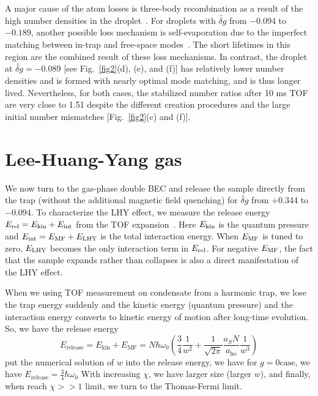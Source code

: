 A major cause of the atom losses is three-body recombination as a result of the high number densities in the droplet~\cite{cabrera2018quantum,semeghini2018self,DErrico2019}. For droplets with $\widetilde{\delta g}$ from $-0.094$ to $-0.189$, another possible loss mechanism is self-evaporation due to the imperfect matching between in-trap and free-space modes~\cite{Ferioli2020}. The short lifetimes in this region are the combined result of these loss mechanisms. In contrast, the droplet at $\widetilde{\delta g} = -0.089$ [see Fig.~\ref{fig2}(d), (e), and (f)] has relatively lower number densities and is formed with nearly optimal mode matching, and is thus longer lived. Nevertheless, for both cases, the stabilized number ratios after 10 ms TOF are very close to 1.51 despite the different creation procedures and the large initial number mismatches [Fig.~\ref{fig2}(c) and (f)].

\section{Lee-Huang-Yang gas}
\label{sec:LHY_gas}

We now turn to the gas-phase double BEC and release the sample directly from the trap (without the additional magnetic field quenching) for $\widetilde{\delta g}$ from +0.344 to $-0.094$. To characterize the LHY effect, we measure the release energy $E_{\rm rel}=E_{\rm kin}+E_{\rm int}$ from the TOF expansion~\cite{Holland1997,Mewes1996}. Here $E_\text{\rm kin}$ is the quantum pressure and $E_{\rm int}=E_{\rm MF}+E_{\rm LHY}$ is the total interaction energy. When $E_{\rm MF}$ is tuned to zero, $E_{\rm LHY}$ becomes the only interaction term in $E_{\rm rel}$. For negative $E_{\rm MF}$, the fact that the sample expands rather than collapses is also a direct manifestation of the LHY effect.

When we using TOF measurement on condensate from a harmonic trap, we lose the trap energy suddenly and the kinetic energy (quantum pressure) and the interaction energy converts to kinetic energy of motion after long-time evolution. So, we have the release energy
\begin{equation}
E_{\text{release}}=E_{\text{kin}}+E_{\text{MF}}=N \hbar  \omega _0\left(\frac{3}{4}\frac{1}{w^2}+\frac{1}{\sqrt{2\pi }}\frac{a_SN}{a_{\text{ho}}}\frac{1}{w^3}\right)
\end{equation}
put the numerical solution of $w$ into the release energy, we have for $g=0 \text{case}$, we have $E_{\text{release}}=\frac{3}{4}\hbar \omega _0$ With increasing $\chi$, we have larger size (larger $w$), and finally, when reach $\chi >>1$ limit, we turn to the Thomas-Fermi limit.


